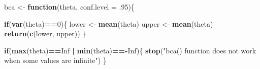 \documentclass[
]{article}
\newenvironment{Shaded}{\begin{snugshade}}{\end{snugshade}}
\newcommand{\AttributeTok}[1]{\textcolor[rgb]{0.13,0.29,0.53}{#1}}
\newcommand{\ConstantTok}[1]{\textcolor[rgb]{0.56,0.35,0.01}{#1}}
\newcommand{\ControlFlowTok}[1]{\textcolor[rgb]{0.13,0.29,0.53}{\textbf{#1}}}
\newcommand{\DecValTok}[1]{\textcolor[rgb]{0.00,0.00,0.81}{#1}}
\newcommand{\FunctionTok}[1]{\textcolor[rgb]{0.13,0.29,0.53}{\textbf{#1}}}
\newcommand{\NormalTok}[1]{#1}
\newcommand{\OtherTok}[1]{\textcolor[rgb]{0.56,0.35,0.01}{#1}}
\newcommand{\SpecialCharTok}[1]{\textcolor[rgb]{0.81,0.36,0.00}{\textbf{#1}}}
\newcommand{\StringTok}[1]{\textcolor[rgb]{0.31,0.60,0.02}{#1}}
\begin{document}
\begin{Shaded}
\begin{Highlighting}[]
\NormalTok{bca }\OtherTok{\textless{}{-}} \ControlFlowTok{function}\NormalTok{(theta, }\AttributeTok{conf.level =}\NormalTok{ .}\DecValTok{95}\NormalTok{)\{}

  \ControlFlowTok{if}\NormalTok{(}\FunctionTok{var}\NormalTok{(theta)}\SpecialCharTok{==}\DecValTok{0}\NormalTok{)\{}
\NormalTok{    lower }\OtherTok{\textless{}{-}} \FunctionTok{mean}\NormalTok{(theta)}
\NormalTok{    upper }\OtherTok{\textless{}{-}} \FunctionTok{mean}\NormalTok{(theta)}
    \FunctionTok{return}\NormalTok{(}\FunctionTok{c}\NormalTok{(lower, upper))}
\NormalTok{  \}}

  \ControlFlowTok{if}\NormalTok{(}\FunctionTok{max}\NormalTok{(theta)}\SpecialCharTok{==}\ConstantTok{Inf} \SpecialCharTok{|} \FunctionTok{min}\NormalTok{(theta)}\SpecialCharTok{=={-}}\ConstantTok{Inf}\NormalTok{)\{}
    \FunctionTok{stop}\NormalTok{(}\StringTok{"bca() function does not work when some values are infinite"}\NormalTok{)}
\NormalTok{  \}}


\end{Highlighting}
\end{Shaded}
\end{document}
